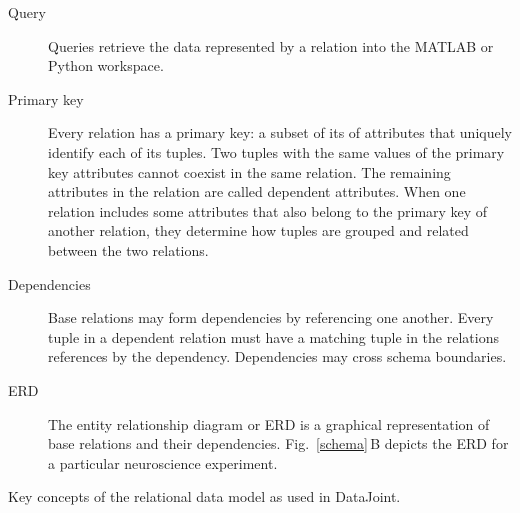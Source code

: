 \begin{boxedminipage}{\textwidth}
\begin{description}
\item[Query] Queries retrieve the data represented by a relation into the MATLAB or Python workspace.

\item[Primary key] Every relation has a primary key: a subset of its of attributes that uniquely identify each of its tuples. 
Two tuples with the same values of the primary key attributes cannot coexist in the same relation.
The remaining attributes in the relation are called dependent attributes. 
When one relation includes some attributes that also belong to the primary key of another relation, they determine how tuples are grouped and related between the two relations.

\item[Dependencies]
Base relations may form dependencies by referencing one another. 
Every tuple in a dependent relation must have a matching tuple in the relations references by the dependency. 
Dependencies may cross schema boundaries.

\item[ERD]
The entity relationship diagram or ERD is a graphical representation of base relations and their dependencies.
Fig.\ \ref{schema}\,B depicts the ERD for a particular neuroscience experiment. 
\end{description}
\end{boxedminipage}
\caption{Key concepts of the relational data model as used in DataJoint.}
\label{glossary}

